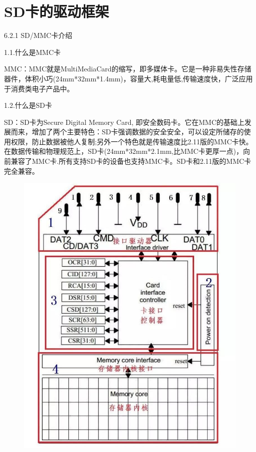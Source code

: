 \section{SD卡的驱动框架}
6.2.1 SD/MMC卡介绍

1.1.什么是MMC卡

MMC：MMC就是MultiMediaCard的缩写，即多媒体卡。它是一种非易失性存储器件，体积小巧(24mm*32mm*1.4mm)，容量大,耗电量低,传输速度快，广泛应用于消费类电子产品中。

1.2.什么是SD卡

SD：SD卡为Secure Digital Memory Card, 即安全数码卡。它在MMC的基础上发展而来，增加了两个主要特色：SD卡强调数据的安全安全，可以设定所储存的使用权限，防止数据被他人复制;另外一个特色就是传输速度比2.11版的MMC卡快。在数据传输和物理规范上，SD卡(24mm*32mm*2.1mm,比MMC卡更厚一点)，向前兼容了MMC卡.所有支持SD卡的设备也支持MMC卡。SD卡和2.11版的MMC卡完全兼容。
\begin{figure}[H]
    \centering
    \includegraphics{figures/06-02-SD.jpg}
\end{figure}

